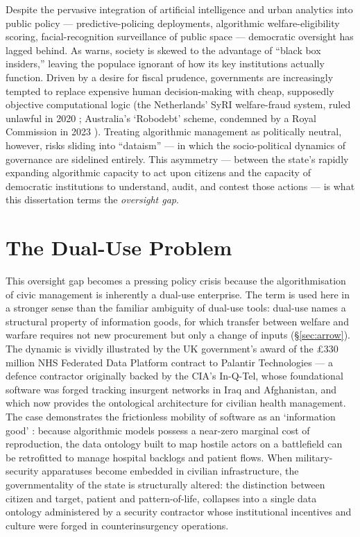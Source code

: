 \documentclass[12pt,a4paper,twoside]{report}
\begin{document}
Despite the pervasive integration of artificial intelligence and urban analytics into public policy — predictive-policing deployments, algorithmic welfare-eligibility scoring, facial-recognition surveillance of public space — democratic oversight has lagged behind. As \textcite[p.190]{pasquale2015} warns, society is skewed to the advantage of ``black box insiders,'' leaving the populace ignorant of how its key institutions actually function. Driven by a desire for fiscal prudence, governments are increasingly tempted to replace expensive human decision-making with cheap, supposedly objective computational logic (the Netherlands' SyRI welfare-fraud system, ruled unlawful in 2020 \parencite{syri2020}; Australia's `Robodebt' scheme, condemned by a Royal Commission in 2023 \parencite{robodebt2023}). Treating algorithmic management as politically neutral, however, risks sliding into ``dataism'' \parencite[p.~198]{vandijck2014} — in which the socio-political dynamics of governance are sidelined entirely. This asymmetry — between the state's rapidly expanding algorithmic capacity to act upon citizens and the capacity of democratic institutions to understand, audit, and contest those actions — is what this dissertation terms the \emph{oversight gap}.

\section{The Dual-Use Problem}
\label{sec:dual-use-problem}

This oversight gap becomes a pressing policy crisis because the algorithmisation of civic management is inherently a dual-use enterprise. The term is used here in a stronger sense than the familiar ambiguity of dual-use tools: dual-use names a structural property of information goods, for which transfer between welfare and warfare requires not new procurement but only a change of inputs (§\ref{sec:arrow}). The dynamic is vividly illustrated by the UK government's award of the £330 million NHS Federated Data Platform contract to Palantir Technologies — a defence contractor originally backed by the CIA's In-Q-Tel, whose foundational software was forged tracking insurgent networks in Iraq and Afghanistan, and which now provides the ontological architecture for civilian health management. The case demonstrates the frictionless mobility of software as an `information good' \parencite[pp.~609--610]{arrow1962}: because algorithmic models possess a near-zero marginal cost of reproduction, the data ontology built to map hostile actors on a battlefield can be retrofitted to manage hospital backlogs and patient flows. When military-security apparatuses become embedded in civilian infrastructure, the governmentality of the state is structurally altered: the distinction between citizen and target, patient and pattern-of-life, collapses into a single data ontology administered by a security contractor whose institutional incentives and culture were forged in counterinsurgency operations.
\end{document}
